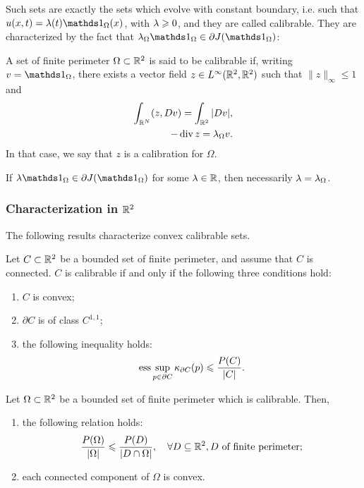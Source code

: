 Such sets are exactly the sets which evolve with constant boundary, i.e. such that $u(x,t)=\la(t)\bun{\Omega}(x)$, with $\lambda \geqslant 0$, and they are called  calibrable. They are characterized by the fact that $\la_\Omega\bun{\Omega}\in \partial J(\bun{\Omega})$:

\begin{defn}
  A set of finite perimeter $\Omega\subset \mathbb{R}^2$ is said to be calibrable if, writing $v=\bun{\Omega}$, there exists a vector field $z\in L^{\infty}(\mathbb{R}^2,\mathbb{R}^2)$ such that $\|z\|_\infty \leq 1$
  and 
  \begin{align*}
    \int_{\mathbb{R}^N} (z, Dv)=\int_{\mathbb{R}^2} |Dv|,\\
    -\operatorname{div} z =\lambda_\Omega v.
  \end{align*}
  In that case, we say that $z$ is a calibration for $\Omega$.
\end{defn}

\begin{rem} If $\la \bun{\Omega}\in \partial J(\bun{\Omega})$ for some $\lambda\in \mathbb{R}$, then necessarily $\lambda=\lambda_\Omega$.
\end{rem}

\subsubsection{Characterization in $\mathbb{R}^2$}
The following results characterize convex calibrable sets.
\begin{prop}
Let $C\subset \mathbb{R}^2$ be a bounded set of finite perimeter, and assume that $C$ is connected. $C$ is calibrable if and only if the following three conditions hold:
\begin{enumerate}
  \item $C$ is convex;
  \item $\partial C$ is of class $C^{1,1}$;
  \item the following inequality holds:
    \begin{align}\label{eq:prelimcalibchar}
      \operatorname{ess} \sup_{p\in \partial C} \kappa_{\partial C} (p)\leqslant \frac{P(C)}{|C|}.
    \end{align}
\end{enumerate}
\end{prop}
\begin{prop}\label{prop:prelimcalibminimal}
Let $\Omega \subset \mathbb{R}^2$ be a bounded set of finite perimeter which is calibrable. Then,
\begin{enumerate}
  \item the following relation holds:
    \begin{align*}
      \frac{P(\Omega)}{|\Omega|} \leqslant \frac{P(D)}{|D\cap \Omega|}, \quad \forall D\subseteq \mathbb{R}^2, D \mbox{ of finite perimeter;}
    \end{align*}
  \item each connected component of $\Omega$ is convex.
\end{enumerate}
\end{prop}

